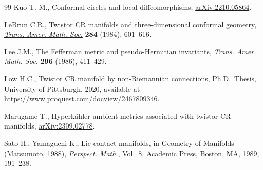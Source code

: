 \documentclass[pdftex]{sigma}
\numberwithin{equation}{section}
\begin{document}
\begin{thebibliography}{99}
Kuo T.-M., Conformal circles and local diffeomorphisms,
 \href{http://arxiv.org/abs/2210.05864}{arXiv:2210.05864}.

LeBrun C.R., Twistor {CR} manifolds and three-dimensional conformal geometry,
 \href{https://doi.org/10.2307/1999098}{\textit{Trans. Amer. Math. Soc.}}
 \textbf{284} (1984), 601--616.

Lee J.M., The {F}efferman metric and pseudo-{H}ermitian invariants,
 \href{https://doi.org/10.2307/2000582}{\textit{Trans. Amer. Math. Soc.}}
 \textbf{296} (1986), 411--429.

Low H.C., Twistor {CR} manifold by non-{R}iemannian connections, Ph.D.~Thesis,
 {U}niversity of Pittsburgh, 2020, available at
 \url{https://www.proquest.com/docview/2467809346}.

Marugame T., Hyperk\"ahler ambient metrics associated with twistor {CR}
 manifolds, \href{http://arxiv.org/abs/2309.02778}{arXiv:2309.02778}.

Sato H., Yamaguchi K., Lie contact manifolds, in Geometry of Manifolds
 ({M}atsumoto, 1988), \textit{Perspect. Math.}, Vol.~8, Academic Press,
 Boston, MA, 1989, 191--238.

\end{thebibliography}\LastPageEnding
\end{document}
